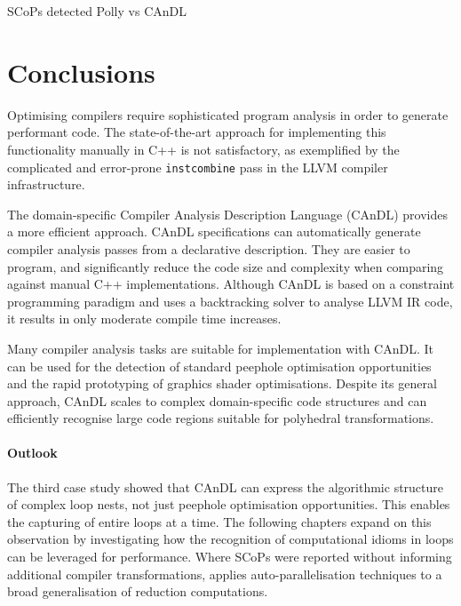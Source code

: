 \begin{table}[ht]
    
    \caption{SCoPs detected Polly vs CAnDL}
    \label{fig:candlvspolly}
\end{table}

\section{Conclusions}

    Optimising compilers require sophisticated program analysis in order to
    generate performant code.
    The state-of-the-art approach for implementing this functionality manually
    in C++ is not satisfactory, as exemplified by the complicated and
    error-prone {\tt instcombine} pass in the LLVM compiler infrastructure.

    The domain-specific Compiler Analysis Description Language (CAnDL) provides
    a more efficient approach.
    CAnDL specifications can automatically generate compiler analysis
    passes from a declarative description.
    They are easier to program, and significantly reduce the code size and
    complexity when comparing against manual C++ implementations.
    Although CAnDL is based on a constraint programming paradigm and uses a
    backtracking solver to analyse LLVM IR code, it results in only moderate
    compile time increases.

    Many compiler analysis tasks are suitable for implementation with CAnDL.
    It can be used for the detection of standard peephole optimisation
    opportunities and the rapid prototyping of graphics shader optimisations.
    Despite its general approach, CAnDL scales to complex domain-specific code
    structures and can efficiently recognise large code regions suitable for
    polyhedral transformations.

    \paragraph*{Outlook}
    The third case study showed that CAnDL can express the algorithmic structure
    of complex loop nests, not just peephole optimisation opportunities.
    This enables the capturing of entire loops at a time.
    The following chapters expand on this observation by investigating how the
    recognition of computational idioms in loops can be leveraged for
    performance.
    Where SCoPs were reported without informing additional compiler
    transformations,  applies auto-parallelisation
    techniques to a broad generalisation of reduction computations.
    
    